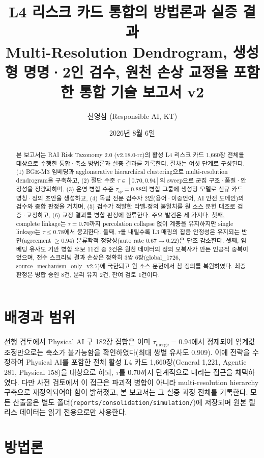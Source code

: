 \documentclass[11pt,a4paper]{article}
\title{\textbf{L4 리스크 카드 통합의 방법론과 실증 결과}\\[4pt]
\large Multi-Resolution Dendrogram, 생성형 명명·2인 검수, 원천 손상 교정을 포함한 통합 기술 보고서 v2}
\author{천영삼 (Responsible AI, KT)}
\date{2026년 8월 6일}
\begin{document}
\maketitle

\begin{abstract}
본 보고서는 RAI Risk Taxonomy 2.0 (v2.18.0-rc)의 활성 L4 리스크 카드 1,660장 전체를 대상으로 수행한 통합·축소 방법론과 실증 결과를 기록한다. 절차는 여섯 단계로 구성된다. (1) BGE-M3 임베딩과 agglomerative hierarchical clustering으로 multi-resolution dendrogram을 구축하고, (2) 절단 수준 $\tau \in [0.70, 0.94]$의 sweep으로 군집 구조·품질·안정성을 정량화하며, (3) 운영 병합 수준 $\tau_{op}=0.88$의 병합 그룹에 생성형 모델로 신규 카드 명칭·정의 초안을 생성하고, (4) 독립 전문 검수자 2인(용어·이중언어, AI 안전 도메인)의 검수와 종합 판정을 거치며, (5) 검수가 적발한 라벨-정의 불일치를 원 소스 문헌 대조로 검증·교정하고, (6) 교정 결과를 병합 판정에 환류한다. 주요 발견은 세 가지다. 첫째, complete linkage는 $\tau=0.70$까지 percolation collapse 없이 계층을 유지하지만 single linkage는 $\tau \leq 0.78$에서 붕괴한다. 둘째, $\tau$를 내릴수록 L3 매핑의 잡음 안정성은 유지되는 반면(agreement $\geq 0.94$) 분류학적 정당성(auto rate $0.67 \to 0.22$)은 단조 감소한다. 셋째, 임베딩 유사도 기반 병합 후보 11건 중 2건은 원천 데이터의 정의 오복사가 만든 인공적 중복이었으며, 전수 스크리닝 결과 손상은 정확히 3쌍 6장(global\_1726, source\_mechanism\_only\_v2.7)에 국한되고 원 소스 문헌에서 참 정의를 복원하였다. 최종 판정은 병합 승인 8건, 분리 유지 2건, 잔여 검토 1건이다.
\end{abstract}

\section{배경과 범위}

선행 검토에서 Physical AI 구 182장 집합은 이미 $\tau_{\mathrm{merge}}=0.94$에서 정제되어 임계값 조정만으로는 축소가 불가능함을 확인하였다(최대 쌍별 유사도 0.909). 이에 전략을 수정하여 Physical AI를 포함한 전체 활성 L4 카드 1,660장(General 1,221, Agentic 281, Physical 158)을 대상으로 하되, $\tau$를 0.70까지 단계적으로 내리는 접근을 채택하였다. 다만 사전 검토에서 이 접근은 파괴적 병합이 아니라 multi-resolution hierarchy 구축으로 재정의되어야 함이 밝혀졌고, 본 보고서는 그 실증 과정 전체를 기록한다. 모든 산출물은 별도 폴더(\texttt{reports/consolidation/simulation/})에 저장되며 원본 릴리스 데이터는 읽기 전용으로만 사용한다.

\section{방법론}
\end{document}

